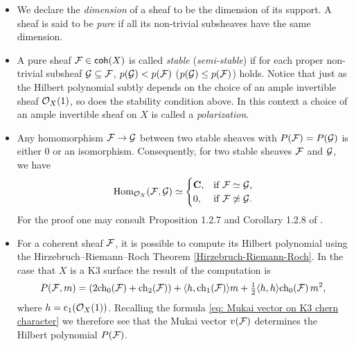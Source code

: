 \begin{itemize}[label = $\vartriangleright$]
{    }
    \item{
        We declare the \emph{dimension} of a sheaf to be the dimension of its support.
        A sheaf is said to be \emph{pure} if all its non-trivial subsheaves have the same dimension. 
    }
    \item{
        A pure sheaf $\mathcal F \in \mathsf{coh}(X)$ is called \emph{stable} (\resp \emph{semi-stable}) if for each proper non-trivial subsheaf $\mathcal G \subseteq \mathcal F$, $p(\mathcal G) < p(\mathcal F)$ (\resp $p(\mathcal G) \leq p(\mathcal F)$) holds. Notice that just as the Hilbert polynomial subtly depends on the choice 
        of an ample invertible sheaf ${\mathcal{O}_{X}}(1)$, so does the stability condition above. In this context a choice of an ample invertible sheaf on $X$ is called a \emph{polarization}.
    }
    \item{
        Any homomorphism $\mathcal F \to \mathcal G$ between two stable sheaves with $P(\mathcal F) = P(\mathcal G)$ is either $0$ or an isomorphism. Consequently, for two stable sheaves $\mathcal F$ and $\mathcal G$, we have
        \begin{equation}
            \label{eq: schur lemma for stable sheaves}
            \mathrm{Hom}_{{\mathcal{O}_{X}}}(\mathcal F, \mathcal G) \simeq \begin{cases}
                \mathbf C, &\text{if $\mathcal F \simeq \mathcal G$,} \\
                0, &\text{if $\mathcal F \not\simeq \mathcal G$.}
            \end{cases}
        \end{equation}
        For the proof one may consult Proposition 1.2.7 and Corollary 1.2.8 of \cite[\S I.1.2]{HuybrechtsLehn2010}.
    }
    \item{
        For a coherent sheaf $\mathcal F$, it is possible to compute its Hilbert polynomial using the Hirzebruch--Riemann--Roch Theorem \ref{Hirzebruch-Riemann-Roch}. In the case that $X$ is a K3 surface the result of the computation is
        \[
            P(\F, m) = (2\ch[0](\F) + \ch[2](\F)) + \pairing{h}{\ch[1](\F)}m + \tfrac{1}{2}\pairing{h}{h}\ch[0]{\F}m^2,
        \]
        where $h = \cclass[1](\struct{X}(1))$. Recalling the formula \eqref{eq: Mukai vector on K3 chern character} we therefore see that the Mukai vector $v(\mathcal F)$ determines the Hilbert polynomial $P(\mathcal F)$. 
    }
\end{itemize}

